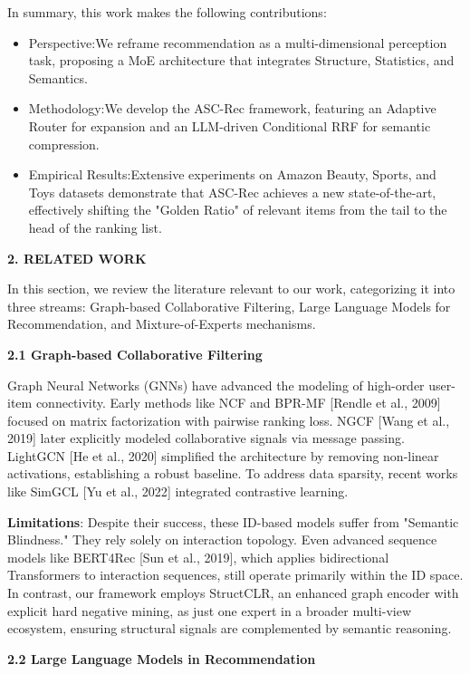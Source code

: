 \documentclass[]{article}
\begin{document}
In summary, this work makes the following contributions:

\begin{itemize}
\item
  Perspective:We reframe recommendation as a multi-dimensional
  perception task, proposing a MoE architecture that integrates
  Structure, Statistics, and Semantics.
\item
  Methodology:We develop the ASC-Rec framework, featuring an Adaptive
  Router for expansion and an LLM-driven Conditional RRF for semantic
  compression.
\item
  Empirical Results:Extensive experiments on Amazon Beauty, Sports, and
  Toys datasets demonstrate that ASC-Rec achieves a new
  state-of-the-art, effectively shifting the "Golden Ratio" of relevant
  items from the tail to the head of the ranking list.
\end{itemize}

\textbf{2. RELATED WORK}

In this section, we review the literature relevant to our work,
categorizing it into three streams: Graph-based Collaborative Filtering,
Large Language Models for Recommendation, and Mixture-of-Experts
mechanisms.

\textbf{2.1 Graph-based Collaborative Filtering}

Graph Neural Networks (GNNs) have advanced the modeling of high-order
user-item connectivity. Early methods like NCF and BPR-MF {[}Rendle et
al., 2009{]} focused on matrix factorization with pairwise ranking loss.
NGCF {[}Wang et al., 2019{]} later explicitly modeled collaborative
signals via message passing. LightGCN {[}He et al., 2020{]} simplified
the architecture by removing non-linear activations, establishing a
robust baseline. To address data sparsity, recent works like SimGCL
{[}Yu et al., 2022{]} integrated contrastive learning.

\textbf{Limitations}: Despite their success, these ID-based models
suffer from "Semantic Blindness." They rely solely on interaction
topology. Even advanced sequence models like BERT4Rec {[}Sun et al.,
2019{]}, which applies bidirectional Transformers to interaction
sequences, still operate primarily within the ID space. In contrast, our
framework employs StructCLR, an enhanced graph encoder with explicit
hard negative mining, as just one expert in a broader multi-view
ecosystem, ensuring structural signals are complemented by semantic
reasoning.

\textbf{2.2 Large Language Models in Recommendation}
\end{document}
